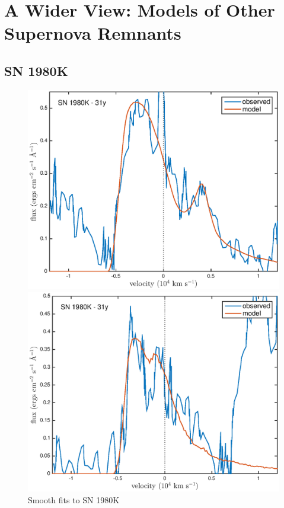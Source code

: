 \chapter{A Wider View: Models of Other Supernova Remnants}\label{chp:chp6}

%
%



\section{SN 1980K}

\begin{figure}
\centering
\includegraphics[scale=0.8,clip=true, trim=20 10 40 20]{chapters/chapter6/figs/80K/Ha_31y}

\includegraphics[scale=0.8,clip=true, trim=20 0 40 20]{chapters/chapter6/figs/80K/OI_31y}
\caption{Smooth fits to SN 1980K}
\label{80K_smooth}
\end{figure}

